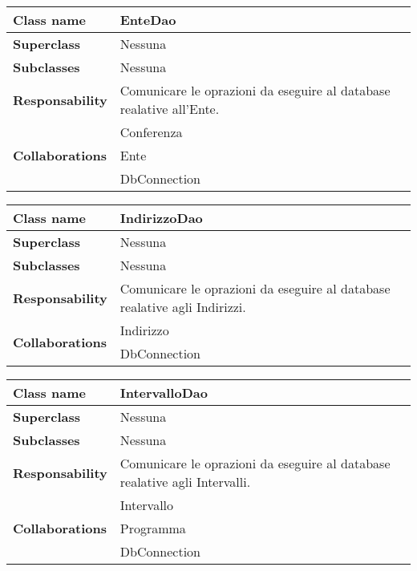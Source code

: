 \begin{table}[h!]
	\begin{tabular}{|l|l|}
		\hline 
		\textbf{Class name} & EnteDao
		\\ \hline
		\textbf{Superclass} & Nessuna
		\\ \hline
		\multirow{1}{*}{\textbf{Subclasses}} & Nessuna
		\\ \hline
		\textbf{Responsability} & Comunicare le oprazioni da eseguire al database realative all'Ente.
		\\ \hline
		\multirow{3}{*}{\textbf{Collaborations}} & Conferenza \\ 
		& Ente \\
		& DbConnection \\ \hline
	\end{tabular}
\end{table}

\begin{table}[h!]
	\begin{tabular}{|l|l|}
		\hline 
		\textbf{Class name} & IndirizzoDao
		\\ \hline
		\textbf{Superclass} & Nessuna
		\\ \hline
		\multirow{1}{*}{\textbf{Subclasses}} & Nessuna
		\\ \hline
		\textbf{Responsability} & Comunicare le oprazioni da eseguire al database realative agli Indirizzi.
		\\ \hline
		\multirow{2}{*}{\textbf{Collaborations}} & Indirizzo \\ 
		& DbConnection \\
	\hline
	\end{tabular}
\end{table}	

\newpage

\begin{table}[h!]
	\begin{tabular}{|l|l|}
		\hline 
		\textbf{Class name} & IntervalloDao
		\\ \hline
		\textbf{Superclass} & Nessuna
		\\ \hline
		\multirow{1}{*}{\textbf{Subclasses}} & Nessuna
		\\ \hline
		\textbf{Responsability} & Comunicare le oprazioni da eseguire al database realative agli Intervalli.
		\\ \hline
		\multirow{3}{*}{\textbf{Collaborations}} & Intervallo \\ 
		& Programma \\
		& DbConnection \\ \hline
	\end{tabular}
\end{table}

